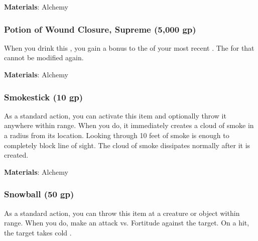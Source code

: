 \vspace{0.25em}
\textbf{Materials}: Alchemy


\lowercase{\hypertarget{item:Potion of Wound Closure, Supreme}{}}\label{item:Potion of Wound Closure, Supreme}
\hypertarget{item:Potion of Wound Closure, Supreme}{\subsubsection{Potion of Wound Closure, Supreme\hfill{} (5,000 gp)}}

When you drink this , you gain a  bonus to the  of your most recent .
The  for that  cannot be modified again.



\vspace{0.25em}
\textbf{Materials}: Alchemy


\lowercase{\hypertarget{item:Smokestick}{}}\label{item:Smokestick}
\hypertarget{item:Smokestick}{\subsubsection{Smokestick\hfill{} (10 gp)}}

As a standard action, you can activate this item and optionally throw it anywhere within \rngclose range.
When you do, it immediately creates a cloud of smoke in a \areasmall radius from its location.
Looking through 10 feet of smoke is enough to completely block line of sight.
The cloud of smoke dissipates normally after it is created.



\vspace{0.25em}
\textbf{Materials}: Alchemy


\lowercase{\hypertarget{item:Snowball}{}}\label{item:Snowball}
\hypertarget{item:Snowball}{\subsubsection{Snowball\hfill{} (50 gp)}}

As a standard action, you can throw this item at a creature or object within \rngclose range.
When you do, make an attack vs. Fortitude against the target.
On a hit, the target takes cold .



